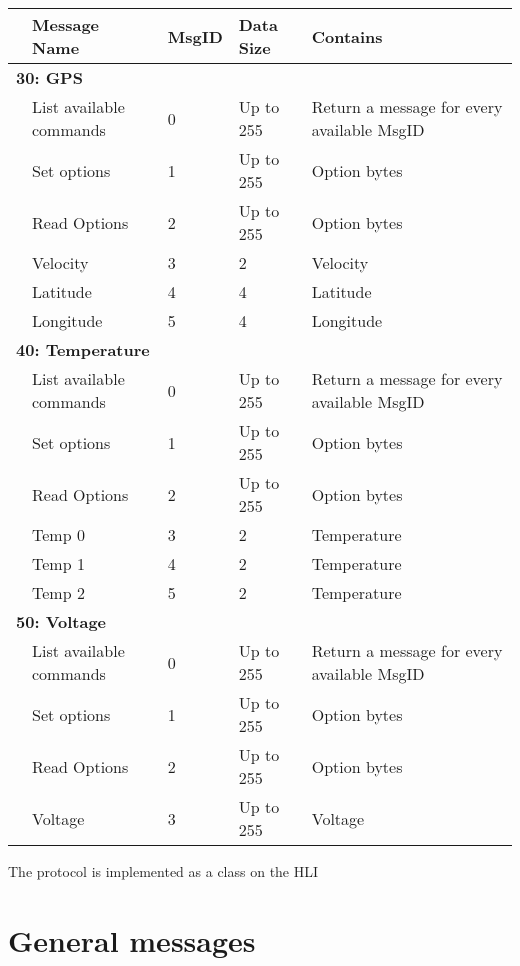 \begin{table}[h!]
\centering
	\begin{tabular}{lllll}
	\toprule
	& \textbf{Message Name} & \textbf{MsgID} & \textbf{Data Size} & \textbf{Contains}\\
	\midrule
	\multicolumn{5}{l}{\textbf{30: GPS}}\\
	\midrule
	& List available commands & 0 & Up to 255 & Return a message for every available MsgID\\
	& Set options & 1 & Up to 255 & Option bytes\\
	& Read Options & 2 & Up to 255 & Option bytes\\
	& Velocity & 3 & 2 & Velocity\\
	& Latitude & 4 & 4 & Latitude\\
	& Longitude & 5 & 4 & Longitude\\
	\midrule
	\multicolumn{5}{l}{\textbf{40: Temperature}}\\
	\midrule
	& List available commands & 0 & Up to 255 & Return a message for every available MsgID\\
	& Set options & 1 & Up to 255 & Option bytes\\
	& Read Options & 2 & Up to 255 & Option bytes\\
	& Temp 0 & 3 & 2 & Temperature \\
	& Temp 1 & 4 & 2 & Temperature \\
	& Temp 2 & 5 & 2 & Temperature \\
	\midrule
	\multicolumn{5}{l}{\textbf{50: Voltage}}\\
	\midrule
	& List available commands & 0 & Up to 255 & Return a message for every available MsgID\\
	& Set options & 1 & Up to 255 & Option bytes\\
	& Read Options & 2 & Up to 255 & Option bytes\\
	& Voltage & 3 & Up to 255 & Voltage\\
	\bottomrule
	\end{tabular}
\end{table}

The protocol is implemented as a class on the HLI


\section{General messages}

